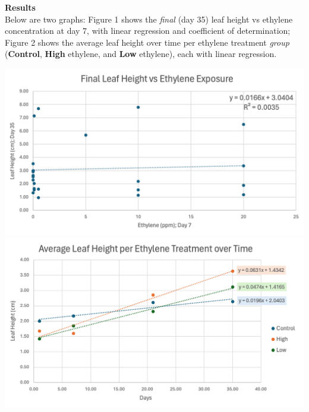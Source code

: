 \documentclass{report}
\newenvironment{minifig}
  {\noindent\minipage{\linewidth}}
  {\endminipage}
\begin{document}
\begin{multicols}{3}
  \textbf{Results}\\
  Below are two graphs: Figure 1 shows the \textit{final} (day 35) leaf height vs ethylene concentration at day 7, with linear regression and coefficient of determination; Figure 2 shows the average leaf height over time per ethylene treatment \textit{group} (\textbf{Control}, \textbf{High} ethylene, and \textbf{Low} ethylene), each with linear regression.

  \begin{minifig}
    \centering
    \includegraphics[width=\linewidth]{graph2.png}
    \medskip
  \end{minifig}
  \vfill\null
  \columnbreak
  \begin{minifig}
    \medskip
    \centering
    \includegraphics[width=\linewidth]{graph1.png}
  \end{minifig}


\end{multicols}
\end{document}
